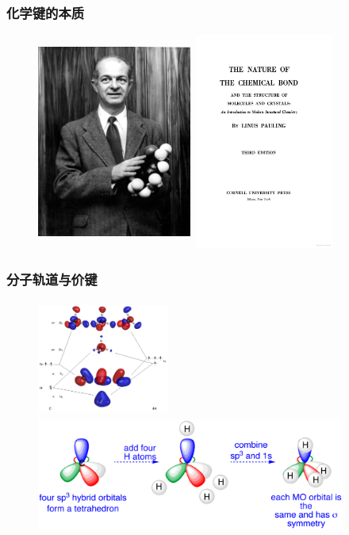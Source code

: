 {\frame
{
	\frametitle{化学键的本质}
\begin{figure}[h!]
\centering
\vspace{-10.5pt}
\includegraphics[height=2.80in,width=2.00in,viewport=0 0 1600 2050,clip]{Figures/Linus_Pauling.jpeg}
\includegraphics[height=2.80in,width=1.85in,viewport=0 0 420 650,clip]{Figures/The-Nature-of-the-Chemical-Bond_content.png}
\label{Pauling:Bond_Hybrid}
\end{figure}
}

\frame
{
	\frametitle{分子轨道与价键}
\begin{figure}[h!]
\centering
\vspace{-10.5pt}
\includegraphics[height=1.50in,width=1.70in,viewport=0 0 820 680,clip]{Figures/MO-CH4.jpg}
\includegraphics[height=1.45in,width=4.00in,viewport=0 0 2100 750,clip]{Figures/methane-sp3.png}
\label{MO-vs-VB:CH4}
\end{figure}
}

}
